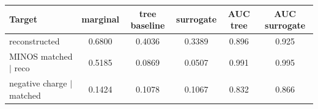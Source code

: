 \begin{tabular}{lccccc}
\toprule
Target & marginal & tree baseline & surrogate & AUC tree & AUC surrogate \\
\midrule
reconstructed & 0.6800 & 0.4036 & 0.3389 & 0.896 & 0.925 \\
MINOS matched $\mid$ reco & 0.5185 & 0.0869 & 0.0507 & 0.991 & 0.995 \\
negative charge $\mid$ matched & 0.1424 & 0.1078 & 0.1067 & 0.832 & 0.866 \\
\bottomrule
\end{tabular}
